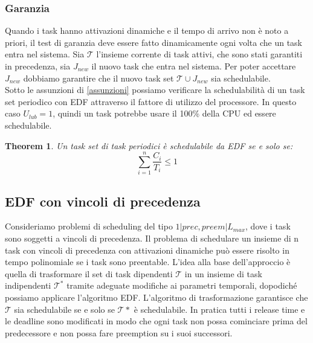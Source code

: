 \documentclass[12pt]{article}
\newtheorem{theorem}{Theorem}
\begin{document}
\subsubsection{Garanzia}
Quando i task hanno attivazioni dinamiche e il tempo di arrivo non è noto a priori, il test di garanzia deve essere fatto dinamicamente ogni volta che un task entra nel sistema.
Sia $\mathcal{T}$ l'insieme corrente di task attivi, che sono stati garantiti in precedenza, sia $J_{new}$ il nuovo task che entra nel sistema.
Per poter accettare $J_{new}$ dobbiamo garantire che il nuovo task set $\mathcal{T} \cup J_{new}$ sia schedulabile.\\
Sotto le assunzioni di \ref{assunzioni} possiamo verificare la schedulabilità di un task set periodico con EDF attraverso il fattore di utilizzo del processore.
In questo caso $U_{lub}=1$, quindi un task potrebbe usare il 100\% della CPU ed essere schedulabile.
\begin{theorem}
    Un task set di task periodici è schedulabile da EDF se e solo se:
    \begin{equation}
        \sum_{i=1}^{n}\frac{C_i}{T_i}\leq 1
    \end{equation}
\end{theorem}
\subsection{EDF con vincoli di precedenza}
Consideriamo problemi di scheduling del tipo $1|prec,preem|L_{max}$, dove i task sono soggetti a vincoli di precedenza.
Il problema di schedulare un insieme di n task con vincoli di precedenza con attivazioni dinamiche può essere risolto in tempo polinomiale  se i task sono preentable.
L'idea alla base dell'approccio è quella di trasformare  il set di task dipendenti $\mathcal{T}$ in un insieme di task indipendenti $\mathcal{T}^*$ tramite adeguate modifiche ai parametri temporali, dopodiché possiamo applicare l'algoritmo EDF.
L'algoritmo di trasformazione garantisce che $\mathcal{T}$ sia schedulabile se e solo se $\mathcal{T}*$ è schedulabile. In pratica tutti i release time e le deadline sono modificati in modo che ogni task non possa cominciare prima del predecessore e non possa fare preemption su i suoi successori.
\end{document}
